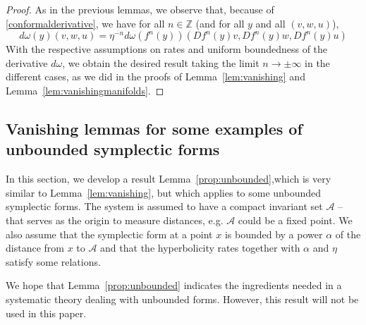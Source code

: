 \documentclass[11pt]{amsart}
\theoremstyle{definition}
\theoremstyle{remark}
\numberwithin{equation}{section}
\newcommand{\Z}{\mathbb Z}
\begin{document}
\begin{proof}
 As in the previous lemmas, we observe that, because of
  \eqref{conformalderivative}, we have
  for all $n \in \Z$ (and for all $y$ and all $(v,w,u)$),
  \[
  d\omega(y) ( v, w, u) = \eta^{-n} d\omega(f^n(y))(
  Df^n(y)v, Df^n(y) w, Df^n(y)u )
  \]
  With the respective assumptions on rates and  uniform boundedness
  of the derivative $d\omega$, we obtain the desired result taking the limit
  $n \to \pm \infty$ in the different cases, as we  did in the proofs
  of Lemma~\ref{lem:vanishing} and Lemma~\ref{lem:vanishingmanifolds}.
\end{proof}





\subsection{Vanishing lemmas for some examples of unbounded symplectic forms}
\label{sec:unbounded_forms}
In this section, we develop a  result Lemma~\ref{prop:unbounded},which is very
similar to Lemma~\ref{lem:vanishing}, but which applies to some unbounded
symplectic forms. The system is assumed to have a compact invariant set
$\mathcal{A}$ -- that serves as the origin to measure distances, e.g.
$\mathcal{A}$ could be a fixed  point.
We also assume that the symplectic form  at a point $x$  is bounded
by a power $\alpha$ of the distance from $x$ to $\mathcal{A}$ and that the hyperbolicity
rates together with $\alpha$ and $\eta$ satisfy some relations.


We hope that Lemma~\ref{prop:unbounded}  indicates the ingredients needed in a systematic theory dealing with
unbounded forms. However, this result will not be used in this paper.
\end{document}
